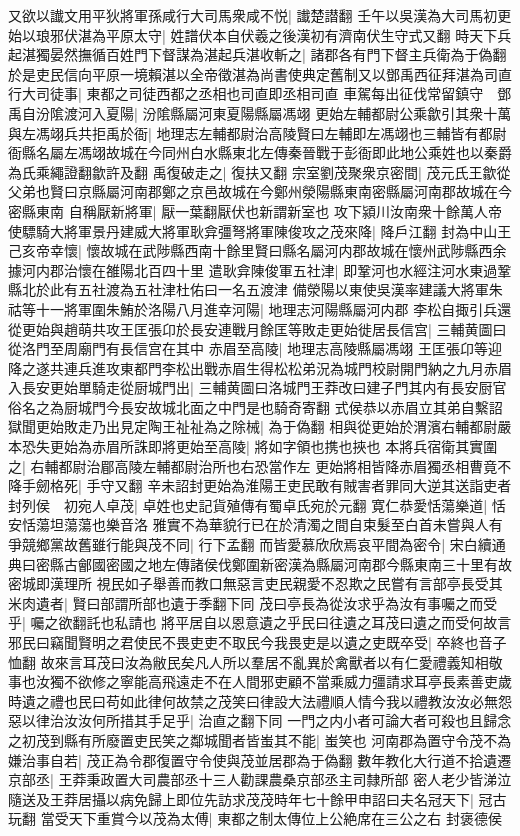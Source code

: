 又欲以䜟文用平狄將軍孫咸行大司馬衆咸不悦|{
	䜟楚譛翻}
壬午以吳漢為大司馬初更始以琅邪伏湛為平原太守|{
	姓譜伏本自伏羲之後漢初有濟南伏生守式又翻}
時天下兵起湛獨晏然撫循百姓門下督謀為湛起兵湛收斬之|{
	諸郡各有門下督主兵衛為于偽翻}
於是吏民信向平原一境賴湛以全帝徵湛為尚書使典定舊制又以鄧禹西征拜湛為司直行大司徒事|{
	東都之司徒西都之丞相也司直即丞相司直}
車駕每出征伐常留鎮守　鄧禹自汾隂渡河入夏陽|{
	汾隂縣屬河東夏陽縣屬馮翊}
更始左輔都尉公乘歙引其衆十萬與左馮翊兵共拒禹於衙|{
	地理志左輔都尉治高陵賢曰左輔即左馮翊也三輔皆有都尉衙縣名屬左馮翊故城在今同州白水縣東北左傳秦晉戰于彭衙即此地公乘姓也以秦爵為氏乘繩證翻歙許及翻}
禹復破走之|{
	復扶又翻}
宗室劉茂聚衆京密間|{
	茂元氏王歙從父弟也賢曰京縣屬河南郡鄭之京邑故城在今鄭州滎陽縣東南密縣屬河南郡故城在今密縣東南}
自稱厭新將軍|{
	厭一葉翻厭伏也新謂新室也}
攻下潁川汝南衆十餘萬人帝使驃騎大將軍景丹建威大將軍耿弇彊弩將軍陳俊攻之茂來降|{
	降戶江翻}
封為中山王　己亥帝幸懷|{
	懷故城在武陟縣西南十餘里賢曰縣名屬河内郡故城在懷州武陟縣西余據河内郡治懷在雒陽北百四十里}
遣耿弇陳俊軍五社津|{
	即鞏河也水經注河水東過鞏縣北於此有五社渡為五社津杜佑曰一名五渡津}
備滎陽以東使吳漢率建議大將軍朱祜等十一將軍圍朱鮪於洛陽八月進幸河陽|{
	地理志河陽縣屬河内郡}
李松自掫引兵還從更始與趙萌共攻王匡張卬於長安連戰月餘匡等敗走更始徙居長信宫|{
	三輔黄圖曰從洛門至周廟門有長信宫在其中}
赤眉至高陵|{
	地理志高陵縣屬馮翊}
王匡張卬等迎降之遂共連兵進攻東都門李松出戰赤眉生得松松弟況為城門校尉開門納之九月赤眉入長安更始單騎走從厨城門出|{
	三輔黄圖曰洛城門王莽改曰建子門其内有長安厨官俗名之為厨城門今長安故城北面之中門是也騎奇寄翻}
式侯恭以赤眉立其弟自繫詔獄聞更始敗走乃出見定陶王祉祉為之除械|{
	為于偽翻}
相與從更始於渭濱右輔都尉嚴本恐失更始為赤眉所誅即將更始至高陵|{
	將如字領也携也挾也}
本將兵宿衛其實圍之|{
	右輔都尉治郿高陵左輔都尉治所也右恐當作左}
更始將相皆降赤眉獨丞相曹竟不降手劒格死|{
	手守又翻}
辛未詔封更始為淮陽王吏民敢有賊害者罪同大逆其送詣吏者封列侯　初宛人卓茂|{
	卓姓也史記貨殖傳有蜀卓氏宛於元翻}
寛仁恭愛恬蕩樂道|{
	恬安恬蕩坦蕩蕩也樂音洛}
雅實不為華貌行已在於清濁之間自束髮至白首未嘗與人有爭競鄉黨故舊雖行能與茂不同|{
	行下孟翻}
而皆愛慕欣欣焉哀平間為密令|{
	宋白續通典曰密縣古鄶國密國之地左傳諸侯伐鄭圍新密漢為縣屬河南郡今縣東南三十里有故密城即漢理所}
視民如子舉善而教口無惡言吏民親愛不忍欺之民嘗有言部亭長受其米肉遺者|{
	賢曰部謂所部也遺于季翻下同}
茂曰亭長為從汝求乎為汝有事囑之而受乎|{
	囑之欲翻託也私請也}
將平居自以恩意遺之乎民曰往遺之耳茂曰遺之而受何故言邪民曰竊聞賢明之君使民不畏吏吏不取民今我畏吏是以遺之吏既卒受|{
	卒終也音子恤翻}
故來言耳茂曰汝為敝民矣凡人所以羣居不亂異於禽獸者以有仁愛禮義知相敬事也汝獨不欲修之寧能高飛遠走不在人間邪吏顧不當乘威力彊請求耳亭長素善吏歲時遺之禮也民曰苟如此律何故禁之茂笑曰律設大法禮順人情今我以禮教汝汝必無怨惡以律治汝汝何所措其手足乎|{
	治直之翻下同}
一門之内小者可論大者可殺也且歸念之初茂到縣有所廢置吏民笑之鄰城聞者皆蚩其不能|{
	蚩笑也}
河南郡為置守令茂不為嫌治事自若|{
	茂正為令郡復置守令使與茂並居郡為于偽翻}
數年教化大行道不拾遺遷京部丞|{
	王莽秉政置大司農部丞十三人勸課農桑京部丞主司隸所部}
密人老少皆涕泣隨送及王莽居攝以病免歸上即位先訪求茂茂時年七十餘甲申詔曰夫名冠天下|{
	冠古玩翻}
當受天下重賞今以茂為太傅|{
	東都之制太傳位上公絶席在三公之右}
封褒德侯

